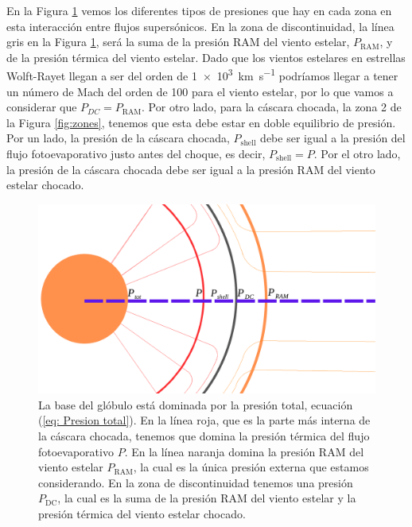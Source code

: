 \documentclass{book}
\begin{document}
En la Figura \ref{fig:zones_presiones} vemos los diferentes tipos de presiones que hay en cada zona en esta interacción entre flujos supersónicos. En la zona de discontinuidad, la línea gris en la Figura \ref{fig:zones_presiones}, será la suma de la presión RAM del viento estelar, $P_\mathrm{RAM}$, y de la presión térmica del viento estelar. Dado que los vientos estelares en estrellas Wolft-Rayet llegan a ser del orden de \SI{1e3}{km.s^{-1}} podríamos llegar a tener un número de Mach del orden de 100 para el viento estelar, por lo que vamos a considerar que $P_{DC}=P_\mathrm{RAM}$. Por otro lado, para la cáscara chocada, la zona 2 de la Figura \ref{fig:zones}, tenemos que esta debe estar en doble equilibrio de presión. Por un lado, la presión de la cáscara chocada, $P_\mathrm{shell}$ debe ser igual a la presión del flujo fotoevaporativo justo antes del choque, es decir, $P_\mathrm{shell}=P$. Por el otro lado, la presión de la cáscara chocada debe ser igual a la presión RAM del viento estelar chocado.

\begin{figure}[htb]
    \centering    \includegraphics[width=\textwidth]{Nuevas imagenes finales/zones_presiones_01.pdf}
    \caption{La base del glóbulo está dominada por la presión total, ecuación (\ref{eq: Presion total}). En la línea roja, que es la parte más interna de la cáscara chocada, tenemos que domina la presión térmica del flujo fotoevaporativo $P$. En la línea naranja domina la presión RAM del viento estelar $P_\mathrm{RAM}$, la cual es la única presión externa que estamos considerando. En la zona de discontinuidad tenemos una presión $P_\mathrm{DC}$, la cual es la suma de la presión RAM del viento estelar y la presión térmica del viento estelar chocado. }
    \label{fig:zones_presiones}
\end{figure}
\end{document}
